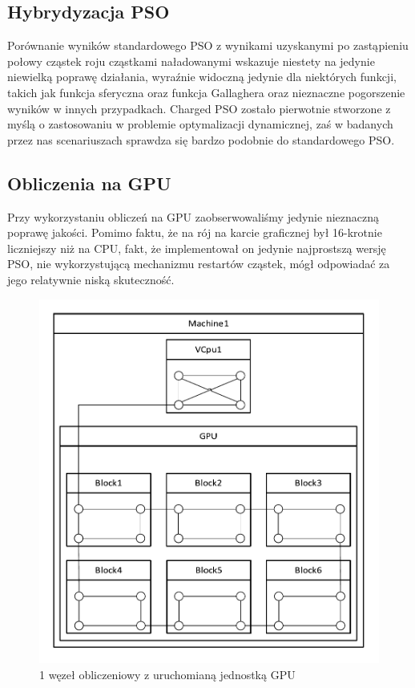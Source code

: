 \documentclass[12pt, twoside, openany, abstract=on]{report}
\theoremstyle{definition}
\begin{document}
\subsection{Hybrydyzacja PSO}
Porównanie wyników standardowego PSO z wynikami uzyskanymi po zastąpieniu połowy cząstek roju cząstkami naładowanymi wskazuje niestety na jedynie niewielką poprawę działania, wyraźnie widoczną jedynie dla niektórych funkcji, takich jak funkcja sferyczna oraz funkcja Gallaghera oraz nieznaczne pogorszenie wyników w innych przypadkach. Charged PSO zostało pierwotnie stworzone z myślą o zastosowaniu w problemie optymalizacji dynamicznej, zaś w badanych przez nas scenariuszach sprawdza się bardzo podobnie do standardowego PSO.

\subsection{Obliczenia na GPU}
Przy wykorzystaniu obliczeń na GPU zaobserwowaliśmy jedynie nieznaczną poprawę jakości. Pomimo faktu, że na rój na karcie graficznej był 16-krotnie liczniejszy niż na CPU, fakt, że implementował on jedynie najprostszą wersję PSO, nie wykorzystującą mechanizmu restartów cząstek, mógł odpowiadać za jego relatywnie niską skuteczność. 

\begin{figure}[H]
    \centering
\includegraphics[scale=1]{klasterBbobWithGPU.pdf} 
 \caption{1 węzeł obliczeniowy z uruchomianą jednostką GPU}
\end{figure}
\end{document}
